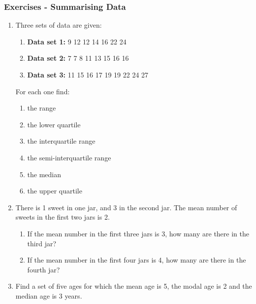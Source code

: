 \begin{description}[noitemsep]
\begin{description}[noitemsep]
            \subsubsection{ Exercises - Summarising Data}
            \nopagebreak
        \label{m39400*id214700}\begin{enumerate}[noitemsep, label=\textbf{\arabic*}. ] 
            \label{m39400*uid87}\item Three sets of data are given:
\label{m39400*id214716}\begin{enumerate}[noitemsep, label=\textbf{\alph*}. ] 
            \label{m39400*uid88}\item \textbf{Data set 1:} 9 12 12 14 16 22 24
\label{m39400*uid89}\item \textbf{Data set 2:} 7 7 8 11 13 15 16 16
\label{m39400*uid90}\item \textbf{Data set 3:} 11 15 16 17 19 19 22 24 27\end{enumerate}
For each one find:
\label{m39400*id214775}\begin{enumerate}[noitemsep, label=\textbf{\alph*}. ] 
            \label{m39400*uid91}\item the range
\label{m39400*uid92}\item the lower quartile
\label{m39400*uid93}\item the interquartile range
\label{m39400*uid94}\item the semi-interquartile range
\label{m39400*uid95}\item the median
\label{m39400*uid96}\item the upper quartile
\end{enumerate}
                \label{m39400*uid97}\item There is 1 sweet in one jar, and 3 in the second jar. The mean number of sweets in the first two jars is 2.
\label{m39400*id214868}\begin{enumerate}[noitemsep, label=\textbf{\alph*}. ] 
            \label{m39400*uid98}\item If the mean number in the first three jars is 3, how many are there in the third jar?
\label{m39400*uid99}\item If the mean number in the first four jars is 4, how many are there in the fourth jar?
\end{enumerate}
                \label{m39400*uid101}\item Find a set of five ages for which the mean age is 5, the modal age is 2 and the median age is 3 years.\newline

\end{enumerate}
\end{description}
\end{description}
